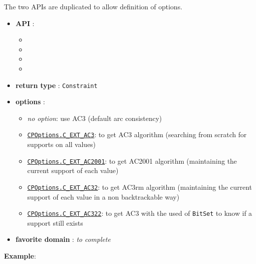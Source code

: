 The two APIs are duplicated to allow definition of options.
\begin{itemize}
	\item \textbf{API} :
	\begin{itemize}
		\item {}
		\item {}
		\item {}
		\item {}
	\end{itemize}
	\item \textbf{return type} : \texttt{Constraint}
	\item \textbf{options} :
	\begin{itemize}
		\item \emph{no option}: use AC3 (default arc consistency)
		\item \hyperlink{cext3:cext3options}{\tt CPOptions.C\_EXT\_AC3}: to get AC3 algorithm (searching from scratch for supports on all values)
		\item \hyperlink{cext2001:cext2001options}{\tt CPOptions.C\_EXT\_AC2001}: to get AC2001 algorithm (maintaining the current support of each value)
		\item \hyperlink{cext32:cext32options}{\tt CPOptions.C\_EXT\_AC32}: to get AC3rm algorithm (maintaining the current support of each value in a non backtrackable way)
		\item \hyperlink{cext322:cext322options}{\tt CPOptions.C\_EXT\_AC322}: to get AC3 with the used of \texttt{BitSet} to know if a support still exists
	\end{itemize}
	\item \textbf{favorite domain} : \emph{to complete}
\end{itemize}

\textbf{Example}:

